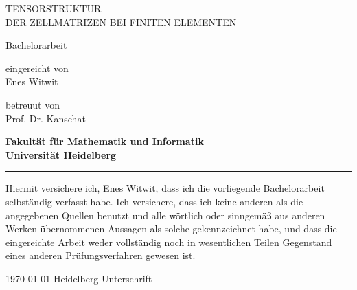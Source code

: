\documentclass[12pt,a4paper]{scrartcl}
\numberwithin{equation}{section}
\begin{document}
\pagestyle{empty}
\setcounter{tocdepth}{2}




\begin{titlepage}

\vspace*{0.5cm} 
\begin{center} 


{\huge{ 

TENSORSTRUKTUR \\ DER ZELLMATRIZEN BEI FINITEN ELEMENTEN
}}
\vspace*{4cm}

{\Large Bachelorarbeit}
\vspace*{1cm}


eingereicht von \\[0.5cm]

{\Large Enes Witwit}
\vspace*{1cm}

betreuut von  \\[0.5cm]
{\Large Prof. Dr. Kanschat}
\vspace*{5cm}

\textbf{
Fakultät für Mathematik und Informatik\\[0.3cm]
Universität Heidelberg}
\end{center}
\end{titlepage}



\newpage
\thispagestyle{empty}
\vspace*{14cm}

\noindent\rule{16cm}{0.4pt}

Hiermit versichere ich, Enes Witwit, dass ich die vorliegende Bachelorarbeit selbständig
verfasst habe.
Ich versichere, dass ich keine anderen als die angegebenen Quellen benutzt und
alle wörtlich oder sinngemäß aus anderen Werken übernommenen Aussagen als
solche gekennzeichnet habe, und dass die eingereichte Arbeit weder vollständig
noch in wesentlichen Teilen Gegenstand eines anderen Prüfungsverfahren
gewesen ist. \\[2ex] 

\noindent


\today \hspace*{1cm}  Heidelberg \hspace*{5cm} Unterschrift\\[5ex]

\end{document}
